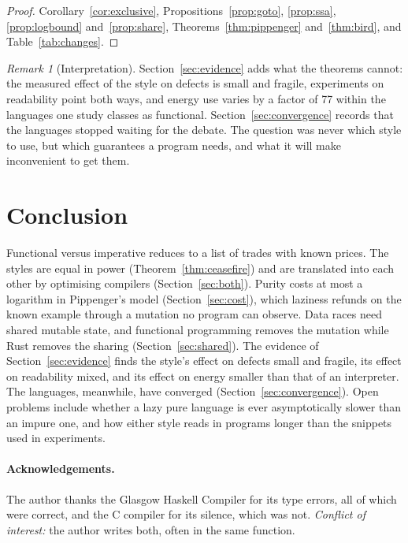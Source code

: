 \documentclass[11pt]{article}
\let\oldsection\section
\renewcommand{\section}{\Needspace{0.25\textheight}\oldsection}
\theoremstyle{definition}
\theoremstyle{remark}
\newtheorem{remark}[theorem]{Remark}
\begin{document}
\begin{proof}
  Corollary~\ref{cor:exclusive}, Propositions~\ref{prop:goto},
  \ref{prop:ssa}, \ref{prop:logbound} and~\ref{prop:share},
  Theorems~\ref{thm:pippenger} and~\ref{thm:bird}, and
  Table~\ref{tab:changes}.
\end{proof}

\begin{remark}[Interpretation]
  Section~\ref{sec:evidence} adds what the theorems cannot: the measured
  effect of the style on defects is small and fragile, experiments on
  readability point both ways, and energy use varies by a factor of 77
  within the languages one study classes as functional.
  Section~\ref{sec:convergence} records that the languages stopped
  waiting for the debate. The question was never which style to use, but
  which guarantees a program needs, and what it will make inconvenient to
  get them.
\end{remark}

\section{Conclusion}

Functional versus imperative reduces to a list of trades with known
prices. The styles are equal in power (Theorem~\ref{thm:ceasefire}) and
are translated into each other by optimising compilers
(Section~\ref{sec:both}). Purity costs at most a logarithm in
Pippenger's model (Section~\ref{sec:cost}), which laziness refunds on
the known example
through a mutation no program can observe. Data races need shared
mutable state, and functional programming
removes the mutation while Rust removes the sharing
(Section~\ref{sec:shared}). The evidence of Section~\ref{sec:evidence}
finds the style's effect on defects small and fragile, its effect on
readability mixed, and its effect on energy smaller than that of an
interpreter. The languages, meanwhile, have converged
(Section~\ref{sec:convergence}). Open problems include whether a lazy
pure language is ever asymptotically slower than an impure one, and how
either style reads in programs longer than the snippets used in
experiments.

\paragraph*{Acknowledgements.} The author thanks the Glasgow Haskell
Compiler for its type errors, all of which were correct, and the C
compiler for its silence, which was not. \emph{Conflict of interest:}
the author writes both, often in the same function.
\end{document}
